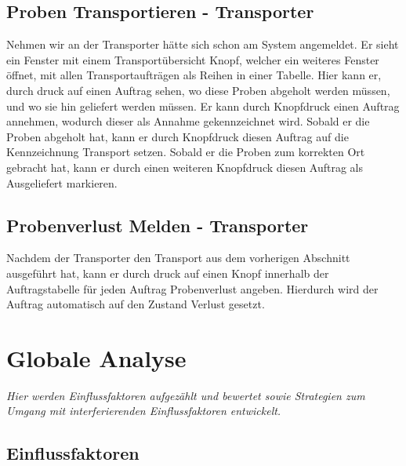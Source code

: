 \documentclass[enabledeprecatedfontcommands,fontsize=12pt,paper=a4,twoside]{scrartcl}
\begin{document}
\subsection{Proben Transportieren - Transporter}

Nehmen wir an der Transporter hätte sich schon am System angemeldet. Er sieht ein Fenster mit einem Transportübersicht Knopf, welcher ein weiteres Fenster öffnet, mit allen Transportaufträgen als Reihen in einer Tabelle. Hier kann er, durch druck auf einen Auftrag sehen, wo diese Proben abgeholt werden müssen, und wo sie hin geliefert werden müssen. 
Er kann durch Knopfdruck einen Auftrag annehmen, wodurch dieser als Annahme gekennzeichnet wird. Sobald er die Proben abgeholt hat, kann er durch Knopfdruck diesen Auftrag auf die Kennzeichnung Transport setzen. Sobald er die Proben zum korrekten Ort gebracht hat, kann er durch einen weiteren Knopfdruck diesen Auftrag als Ausgeliefert markieren.

\subsection{Probenverlust Melden - Transporter}

Nachdem der Transporter den Transport aus dem vorherigen Abschnitt ausgeführt hat, kann er durch druck auf einen Knopf innerhalb der Auftragstabelle für jeden Auftrag Probenverlust angeben. Hierdurch wird der Auftrag automatisch auf den Zustand Verlust gesetzt.


\section{Globale Analyse}

\label{sec:globale_analyse}

{\it Hier werden Einflussfaktoren aufgezählt und bewertet sowie Strategien
zum Umgang mit interferierenden Einflussfaktoren entwickelt.}

\subsection{Einflussfaktoren}


\end{document}
